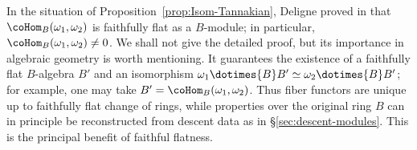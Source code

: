In the situation of Proposition~\ref{prop:Isom-Tannakian}, Deligne proved in
\cite[1.11--1.13]{Del90} that $\coHom_B(\omega_1,\omega_2)$ is faithfully
flat as a $B$-module; in particular,
$\coHom_B(\omega_1,\omega_2)\neq0$. We shall not give the detailed proof,
but its importance in algebraic geometry is worth mentioning. It guarantees
the existence of a faithfully flat $B$-algebra $B'$ and an isomorphism
$\omega_1\dotimes{B}B'\simeq\omega_2\dotimes{B}B'$; for example, one may
take $B'=\coHom_B(\omega_1,\omega_2)$. Thus fiber functors are unique up to
faithfully flat change of rings, while properties over the original ring $B$
can in principle be reconstructed from descent data as in
\S\ref{sec:descent-modules}. This is the principal benefit of faithful
flatness.
